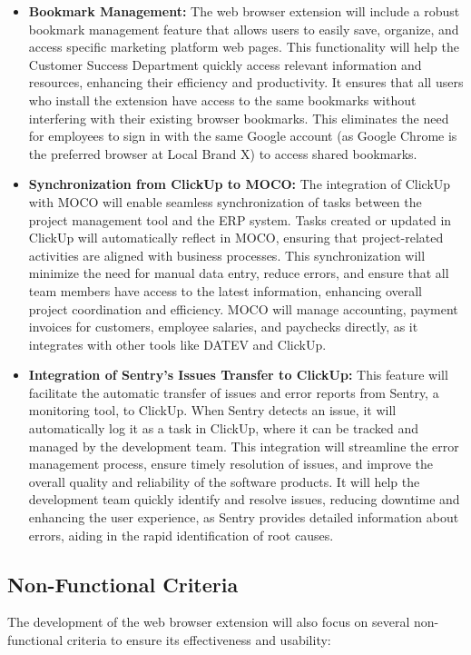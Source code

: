 \begin{itemize}
    \item \textbf{Bookmark Management:}
    The web browser extension will include a robust bookmark management feature that allows users to easily save, organize, and access specific marketing platform web pages. This functionality will help the Customer Success Department quickly access relevant information and resources, enhancing their efficiency and productivity. It ensures that all users who install the extension have access to the same bookmarks without interfering with their existing browser bookmarks. This eliminates the need for employees to sign in with the same Google account (as Google Chrome is the preferred browser at Local Brand X) to access shared bookmarks.

    \item \textbf{Synchronization from ClickUp to MOCO:}
    The integration of ClickUp with MOCO will enable seamless synchronization of tasks between the project management tool and the ERP system. Tasks created or updated in ClickUp will automatically reflect in MOCO, ensuring that project-related activities are aligned with business processes. This synchronization will minimize the need for manual data entry, reduce errors, and ensure that all team members have access to the latest information, enhancing overall project coordination and efficiency. MOCO will manage accounting, payment invoices for customers, employee salaries, and paychecks directly, as it integrates with other tools like DATEV and ClickUp.

    \item \textbf{Integration of Sentry's Issues Transfer to ClickUp:}
    This feature will facilitate the automatic transfer of issues and error reports from Sentry, a monitoring tool, to ClickUp. When Sentry detects an issue, it will automatically log it as a task in ClickUp, where it can be tracked and managed by the development team. This integration will streamline the error management process, ensure timely resolution of issues, and improve the overall quality and reliability of the software products. It will help the development team quickly identify and resolve issues, reducing downtime and enhancing the user experience, as Sentry provides detailed information about errors, aiding in the rapid identification of root causes.
\end{itemize}

\subsection{Non-Functional Criteria}
The development of the web browser extension will also focus on several non-functional criteria to ensure its effectiveness and usability:

